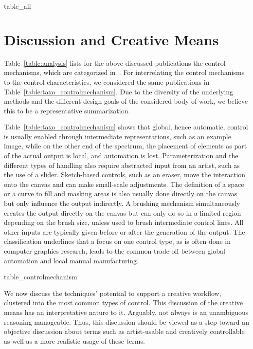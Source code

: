 
{table_all}


\section{Discussion and Creative Means}
\label{sec:discussion_creative_means}

Table~\ref{table:analysis} lists for the above discussed publications the control mechanisms, which are categorized in~. For interrelating the control mechanisms to the control characteristics, we considered the same publications in Table~\ref{table:taxo_controlmechanism}. Due to the diversity of the underlying methods and the different design goals of the considered body of work, we believe this to be a representative summarization.

Table~\ref{table:taxo_controlmechanism} shows that global, hence automatic, control is usually enabled through intermediate representations, such as an example image, while on the other end of the spectrum, the placement of elements as part of the actual output is local, and automation is lost. Parameterization and the different types of handling also require abstracted input from an artist, such as the use of a slider. Sketch-based controls, such as an eraser, move the interaction onto the canvas and can make small-scale adjustments. The definition of a space or a curve to fill and masking areas is also usually done directly on the canvas but only influence the output indirectly. A brushing mechanism simultaneously creates the output directly on the canvas but can only do so in a limited region depending on the brush size, unless used to brush intermediate control lines. All other inputs are typically given before or after the generation of the output. The classification underlines that a focus on one control type, as is often done in computer graphics research, leads to the common trade-off between global automation and local manual manufacturing.

{table_controlmechanism}


We now discuss the techniques' potential to support a creative workflow, clustered into the most common types of control. This discussion of the creative means has an interpretative nature to it. Arguably, not always is an unambiguous reasoning manageable. Thus, this discussion should be viewed as a step toward an objective discussion about terms such as artist-usable and creatively controllable as well as a more realistic usage of these terms.

